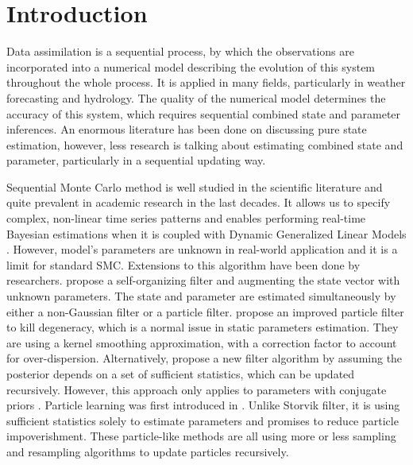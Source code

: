 
\section{Introduction}

Data assimilation is a sequential process, by which the observations are incorporated into a numerical model describing the evolution of this system throughout the whole process. It is applied in many fields, particularly in weather forecasting and hydrology. The quality of the numerical model determines the accuracy of this system, which requires sequential combined state and parameter inferences. An enormous literature has been done on discussing pure state estimation, however, less research is talking about estimating combined state and parameter, particularly in a sequential updating way. 

Sequential Monte Carlo method is well studied in the scientific literature and quite prevalent in academic research in the last decades. It allows us to specify complex, non-linear time series patterns and enables performing real-time Bayesian estimations when it is coupled with Dynamic Generalized Linear Models \citep{vieira2016online}. However, model's parameters are unknown in real-world application and it is a limit for standard SMC. Extensions to this algorithm have been done by researchers. \cite{kitagawa1998self} propose a self-organizing filter and augmenting the state vector with unknown parameters. The state and parameter are estimated simultaneously by either a non-Gaussian filter or a particle filter. \cite{liu2001combined} propose an improved particle filter to kill degeneracy, which is a normal issue in static parameters estimation. They are using a kernel smoothing approximation, with a correction factor to account for over-dispersion. Alternatively, \cite{storvik2002particle} propose a new filter algorithm by assuming the posterior depends on a set of sufficient statistics, which can be updated recursively. However, this approach only applies to parameters with conjugate priors \citep{stroud2016bayesian}. Particle learning was first introduced in \citep{carvalho2010particle}. Unlike Storvik filter, it is using sufficient statistics solely to estimate parameters and promises to reduce particle impoverishment. These particle-like methods are all using more or less sampling and resampling algorithms to update particles recursively. 

